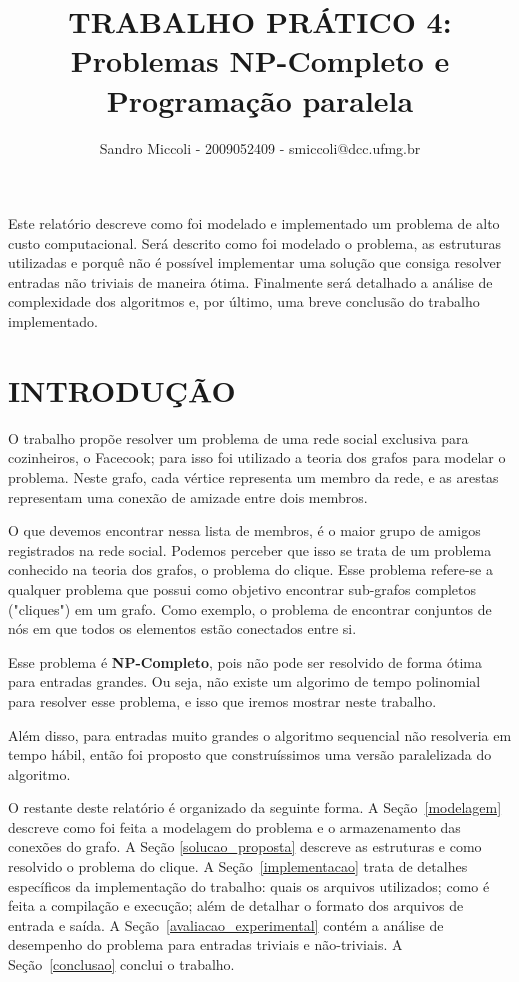 \documentclass[12pt]{article}
\title{TRABALHO PRÁTICO 4: \\ Problemas NP-Completo e Programação paralela}
\author{Sandro Miccoli - 2009052409 - smiccoli@dcc.ufmg.br}
\begin{document}
\maketitle

\begin{resumo}
Este relatório descreve como foi modelado e implementado um problema de alto custo computacional. Será descrito como foi modelado o problema, as estruturas utilizadas e porquê não é possível implementar uma solução que consiga resolver entradas não triviais de maneira ótima. Finalmente será detalhado a análise de complexidade dos algoritmos e, por último, uma breve conclusão do trabalho implementado.
\end{resumo}

\section{INTRODUÇÃO}

    O trabalho propõe resolver um problema de uma rede social exclusiva para cozinheiros, o Facecook; para isso foi utilizado a teoria dos grafos para modelar o problema. Neste grafo, cada vértice representa um membro da rede, e as arestas representam uma conexão de amizade entre dois membros.

    O que devemos encontrar nessa lista de membros, é o maior grupo de amigos registrados na rede social. Podemos perceber que isso se trata de um problema conhecido na teoria dos grafos, o problema do clique. Esse problema refere-se a qualquer problema que possui como objetivo encontrar sub-grafos completos ("cliques") em um grafo. Como exemplo, o problema de encontrar conjuntos de nós em que todos os elementos estão conectados entre si. \cite{wikiclique}

    Esse problema é \textbf{NP-Completo}, pois não pode ser resolvido de forma ótima para entradas grandes. Ou seja, não existe um algorimo de tempo polinomial para resolver esse problema, e isso que iremos mostrar neste trabalho.

    Além disso, para entradas muito grandes o algoritmo sequencial não resolveria em tempo hábil, então foi proposto que construíssimos uma versão paralelizada do algoritmo.

	O restante deste relatório é organizado da seguinte forma. A Seção~\ref{modelagem} descreve como foi feita a modelagem do problema e o armazenamento das conexões do grafo. A Seção \ref{solucao_proposta} descreve as estruturas e como resolvido o problema do clique. A Seção~\ref{implementacao} trata de detalhes específicos da implementação do trabalho: quais os arquivos utilizados; como é feita a compilação e execução; além de detalhar o formato dos arquivos de entrada e saída. A Seção~\ref{avaliacao_experimental} contém a análise de desempenho do problema para entradas triviais e não-triviais. A Seção~\ref{conclusao} conclui o trabalho.
\end{document}
